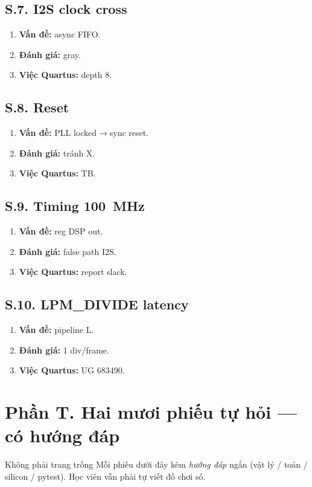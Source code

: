 \subsection*{S.7. I2S clock cross}
\begin{enumerate}\setlength{\itemsep}{2pt}
\item \textbf{Vấn đề:} async FIFO.
\item \textbf{Đánh giá:} gray.
\item \textbf{Việc Quartus:} depth 8.
\end{enumerate}
\subsection*{S.8. Reset}
\begin{enumerate}\setlength{\itemsep}{2pt}
\item \textbf{Vấn đề:} PLL locked$\to$sync reset.
\item \textbf{Đánh giá:} tránh X.
\item \textbf{Việc Quartus:} TB.
\end{enumerate}
\subsection*{S.9. Timing 100~MHz}
\begin{enumerate}\setlength{\itemsep}{2pt}
\item \textbf{Vấn đề:} reg DSP out.
\item \textbf{Đánh giá:} false path I2S.
\item \textbf{Việc Quartus:} report slack.
\end{enumerate}
\subsection*{S.10. LPM\_DIVIDE latency}
\begin{enumerate}\setlength{\itemsep}{2pt}
\item \textbf{Vấn đề:} pipeline L.
\item \textbf{Đánh giá:} 1 div/frame.
\item \textbf{Việc Quartus:} UG 683490.
\end{enumerate}
\newpage\section*{Phần T. Hai mươi phiếu tự hỏi --- có hướng đáp}
\begin{firstprin}{Không phải trang trống}
Mỗi phiếu dưới đây kèm \emph{hướng đáp} ngắn (vật lý / toán / silicon / pytest). Học viên vẫn phải tự viết đồ chơi số.
\end{firstprin}
